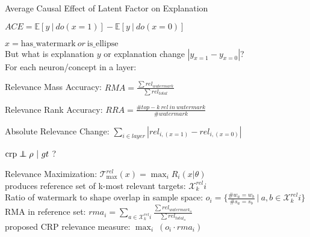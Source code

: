 \begin{center}
    Average Causal Effect of Latent Factor on Explanation

    $\displaystyle ACE = \mathbb{E} [ y \ | \ do(x=1) ] - \mathbb{E} [ y \ | \ do(x=0) ]$
    \vspace{0.5cm}

    $x = \mathrm{has\_watermark} \ or \ \mathrm{is\_ellipse}$ \\
    But what is explanation $y$ or explanation change $|y_{x=1} - y_{x=0}|$?  \\
    For each neuron/concept in a layer:
    \vspace{0.4cm}

    Relevance Mass Accuracy: $\displaystyle RMA = \frac{\sum rel_{watermark}}{\sum rel_{total}}$
    \vspace{0.4cm}

    Relevance Rank Accuracy: $\displaystyle RRA = \frac{\# top-k \ rel \ in \ watermark}{\# watermark}$
    \vspace{0.4cm}

    Absolute Relevance Change: $\displaystyle \sum_{i \in layer} |rel_{i, (x=1)}- rel_{i, (x=0)} | $
    \vspace{0.4cm}

    $\mathrm{crp}  \independent \rho \ | \ gt $ ?
\end{center}
\newpage

\begin{center}
    Relevance Maximization:  $\mathcal{T}_{\max}^{rel}(x) = \max_i R_i(x|\theta)$ \\
    produces reference set of k-most relevant targets: $\mathcal{X}_k^{rel}i$ \\
    Ratio of watermark to shape overlap in sample space: $\displaystyle o_i =  \{
        \frac{\#  w_a = w_b}{\#  s_a = s_b} \ | \  a, b \in \mathcal{X}_k^{rel}i
        \}   $ \\
    RMA in reference set: $\displaystyle rma_i = \sum_{a \in \mathcal{X}_k^{rel}i} \frac{\sum rel_{watermark_a}}{\sum rel_{total_a}}$ \\
    proposed CRP relevance measure: $\displaystyle \max_i \ (o_i \cdot rma_i)$
\end{center}